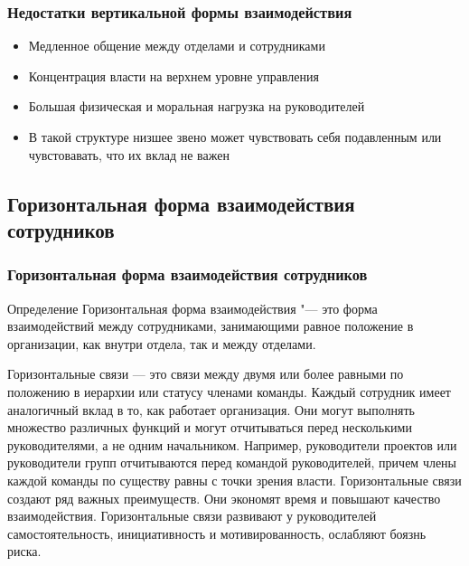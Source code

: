 \documentclass{../industrial-development}
\begin{document}
\begin{frame} \frametitle{Недостатки вертикальной формы взаимодействия}
  
  \begin{itemize}
  \item Медленное общение между отделами и сотрудниками
  \item Концентрация власти на верхнем уровне управления
  \item Большая физическая и моральная нагрузка на руководителей
  \item В такой структуре низшее звено может чувствовать себя подавленным или чувстовавать, что их вклад не важен
  \end{itemize}
\end{frame}

\subsection{Горизонтальная форма взаимодействия сотрудников}

\begin{frame} \frametitle{Горизонтальная форма взаимодействия сотрудников}
  \begin{block}{Определение}
\alert{Горизонтальная форма взаимодействия} "--- это форма взаимодействий между сотрудниками, занимающими равное положение в организации, как внутри отдела, так и между отделами.
  \end{block}
\end{frame}

\lecturenotes
Горизонтальные связи — это связи между двумя или более равными по положению в иерархии или статусу членами команды. Каждый сотрудник имеет аналогичный вклад в то, как работает организация. Они могут выполнять множество различных функций и могут отчитываться перед несколькими руководителями, а не одним начальником. Например, руководители проектов или руководители групп отчитываются перед командой руководителей, причем члены каждой команды по существу равны с точки зрения власти. Горизонтальные связи создают ряд важных преимуществ. Они экономят время и повышают качество взаимодействия. Горизонтальные связи развивают у руководителей самостоятельность, инициативность и мотивированность, ослабляют боязнь риска.
\end{document}
